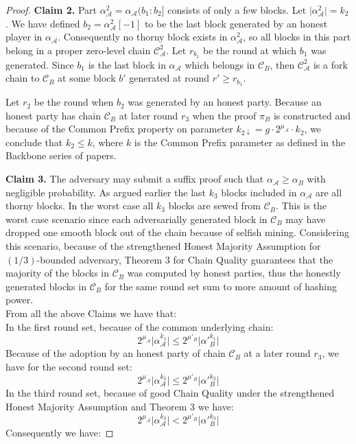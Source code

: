 \begin{proof}
\textbf{Claim 2.}
Part $\alpha_\mathcal{A}^2 = \alpha_\mathcal{A}(b_1:b_2]$ consists of only a few blocks. Let $ \lvert \alpha_\mathcal{A}^2 \rvert = k_2$. We have defined $b_2 = \alpha_\mathcal{A}^2[-1]$ to be the last block generated by an honest player in $\alpha_\mathcal{A}$. Consequently no thorny block exists in $\alpha_\mathcal{A}^2$, so all blocks in this part belong in a proper zero-level chain $\mathcal{C}_\mathcal{A}^2$.  Let $r_{b_1}$ be the round at which $b_1$ was generated. Since $b_1$ is the last block in $\alpha_\mathcal{A}$ which belongs in $\mathcal{C}_B$, then $\mathcal{C}_\mathcal{A}^2$ is a fork chain to $\mathcal{C}_B$ at some block $b'$ generated at round $r' \geq r_{b_1}$.

Let $r_2$ be the round when $b_2$ was generated by an honest party. Because an honest party has chain $\mathcal{C}_B$ at later round $r_3$ when the proof $\pi_B$ is constructed and because of the Common Prefix property on parameter $k_{2\downarrow} = g \cdot 2^{\mu_\mathcal{A}} \cdot k_2$, we conclude that $k_2 \leq k$, where $k$ is the Common Prefix parameter as defined in the Backbone series of papers\cite{backbone}.

\textbf{Claim 3.} The adversary may submit a suffix proof such that $\alpha_\mathcal{A} \geq \alpha_B$ with negligible probability.
As argued earlier the last $k_3$ blocks included in $\alpha_\mathcal{A}$ are all thorny blocks. In the worst case  all $k_3 $ blocks are sewed from $\mathcal{C}_B$. This is the worst case scenario since each adversarially generated block in $\mathcal{C}_B$ may have dropped one smooth block out of the chain because of selfish mining. Considering this scenario, because of the strengthened Honest Majority Assumption for $(1/3)$-bounded adversary, Theorem 3 for Chain Quality guarantees that the majority of the blocks in $\mathcal{C}_B$ was computed by honest parties, thus the honestly generated blocks in $\mathcal{C}_B$ for the same round set sum to more amount of hashing power.\\
From all the above Claims we have that:\\
In the first round set, because of the common underlying chain:
\begin{equation} \label{eq_v_round_set_1}
2^{\mu_\mathcal{A}} \lvert \alpha_\mathcal{A}^{k_1} \rvert \leq 2^{\mu'_B} \lvert \alpha'{_B^{k_1}} \rvert
\end{equation}
Because of the adoption by an honest party of chain $\mathcal{C}_B$ at a later round $r_3$, we have for the second round set:
\begin{equation} \label{eq_v_round_set_2}
	2^{\mu_\mathcal{A}} \lvert \alpha_\mathcal{A}^{k_2} \rvert \leq 2^{\mu'_B} \lvert \alpha'{_B^{k_2}} \rvert
\end{equation}
In the third round set, because of good Chain Quality under the strengthened Honest Majority Assumption and Theorem 3 we have:
\begin{equation} \label{eq_v_round_set_3}
	2^{\mu_\mathcal{A}} \lvert \alpha_\mathcal{A}^{k_3} \rvert < 2^{\mu'_B} \lvert \alpha'{_B^{k_3}} \rvert
\end{equation}
Consequently we have:


\end{proof}
